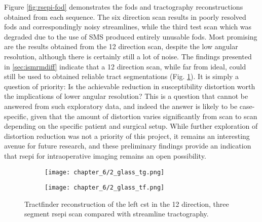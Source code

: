Figure \ref{fig:rsepi-fod} demonstrates the \glspl{fod} and tractography reconstructions obtained from each sequence.
The six direction scan results in poorly resolved \glspl{fod} and correspondingly noisy streamlines, while the third test scan which was degraded due to the use of SMS produced entirely unusable \glspl{fod}.
Most promising are the results obtained from the 12 direction scan, despite the low angular resolution, although there is certainly still a lot of noise.
The findings presented in \ref{sec:ismrmdiff} indicate that a 12 direction scan, while far from ideal, could still be used to obtained reliable tract segmentations (Fig. \ref{fig:ssepi2}).
It is simply a question of priority:
Is the achievable reduction in susceptibility distortion worth the implications of lower angular resolution?
This is a question that cannot be answered from such exploratory data, and indeed the answer is likely to be case-specific, given that the amount of distortion varies significantly from scan to scan depending on the specific patient and surgical setup.
While further exploration of distortion reduction was not a priority of this project, it remains an interesting avenue for future research, and these preliminary findings provide an indication that \gls{rsepi} for intraoperative imaging remains an open possibility.

\begin{figure}
  \centering
  \begin{subfigure}{0.4\textwidth}
    \texttt{[image: chapter\_6/2\_glass\_tg.png]}
  \end{subfigure}%
  \begin{subfigure}{0.4\textwidth}
    \texttt{[image: chapter\_6/2\_glass\_tf.png]}
  \end{subfigure}
  \caption[RS-EPI 12 direction test scan CST reconstructions with tractography and tractfinder]{Tractfinder reconstruction of the left \gls{cst} in the 12 direction, three segment \gls{rsepi} scan compared with streamline tractography.}
  \label{fig:ssepi2}
\end{figure}
